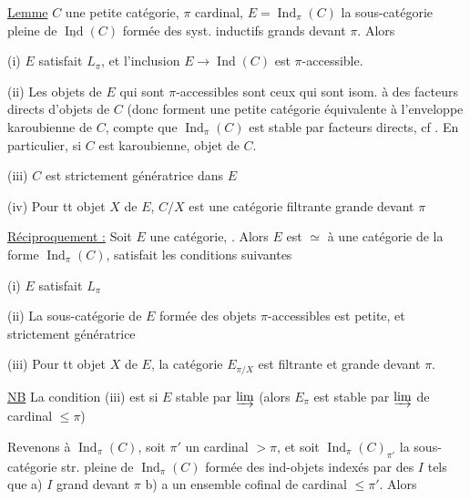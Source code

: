 \uline{Lemme} $C$ une petite catégorie, $\pi$  cardinal, $E=\operatorname{Ind}_{\pi}(C)$ la sous-catégorie pleine de $\underline{\operatorname{Ind}}(C)$ formée des syst. inductifs  grands devant $\pi$. Alors

(i) $E$  satisfait $L_\pi$, et l'inclusion $E\to\operatorname{Ind}(C)$  est $\pi$-accessible.

(ii) Les objets de $E$ qui sont $\pi$-accessibles sont ceux qui sont isom. à des facteurs directs d'objets de $C$ (donc forment une petite catégorie équivalente à l'enveloppe karoubienne de $C$, compte  que $\operatorname{Ind}_\pi(C)$ est stable par facteurs directs, cf \unsure{(i)$'$]|(i)]|(i))}. En particulier, si $C$ est karoubienne,   objet de $C$.

(iii) $C$ est strictement génératrice dans $E$

(iv) Pour tt objet $X$ de $E$, $C/X$ est une  catégorie filtrante grande devant $\pi$

\uline{Réciproquement :} Soit $E$ une catégorie, . Alors $E$ est $\simeq$ à une catégorie de la forme $\operatorname{Ind}_\pi(C)$,   satisfait les conditions suivantes

(i) $E$  satisfait $L_\pi$

(ii) La sous-catégorie  de $E$ formée des objets $\pi$-accessibles est  petite, et strictement génératrice

(iii) Pour tt objet $X$ de $E$, la catégorie $E_{\pi/X}$ est filtrante et grande devant $\pi$.

\uline{NB} La condition (iii) est   si $E$ stable par  $\varinjlim$ (alors $E_\pi$ est stable par $\varinjlim$ de cardinal $\leq\pi$)

Revenons à $\operatorname{Ind}_\pi(C)$, soit $\pi'$ un cardinal $>\pi$, et soit $\operatorname{Ind}_{\pi}(C)_{\pi'}$  la sous-catégorie str. pleine de $\operatorname{Ind}_\pi(C)$ formée des ind-objets indexés par des $I$ tels que a) $I$ grand devant $\pi$ b)   a un ensemble cofinal de cardinal $\leq\pi'$. Alors

